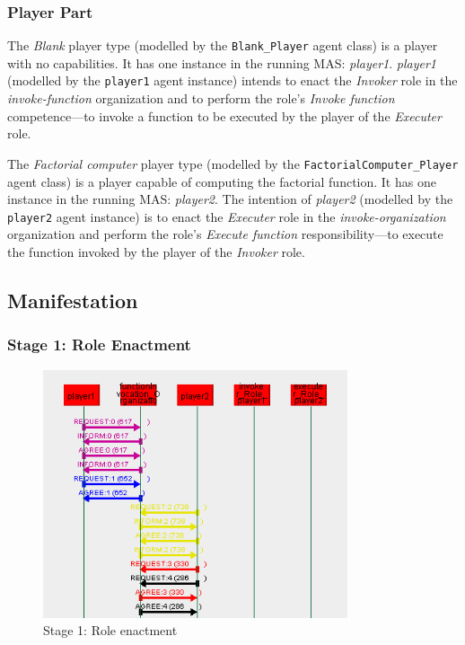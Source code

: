 \subsubsection*{Player Part}

The \textit{Blank} player type (modelled by the \texttt{Blank\_Player} agent class) is a player with no capabilities.
It has one instance in the running MAS: \textit{player1}.
\textit{player1} (modelled by the \texttt{player1} agent instance) intends to enact the \textit{Invoker} role in the \textit{invoke-function} organization and to perform the role's \textit{Invoke function} competence---to invoke a function to be executed by the player of the \textit{Executer} role.

The \textit{Factorial computer} player type (modelled by the \texttt{FactorialComputer\_Player} agent class) is a player capable of computing the factorial function.
It has one instance in the running MAS: \textit{player2}.
The intention of \textit{player2} (modelled by the \texttt{player2} agent instance) is to enact the \textit{Executer} role in the \textit{invoke-organization} organization and perform the role's \textit{Execute function} responsibility---to execute the function invoked by the player of the \textit{Invoker} role.

\subsection*{Manifestation}

\subsubsection*{Stage 1: Role Enactment}

\begin{figure}[H]
	\centering
	\includegraphics[width=0.8\textwidth]{images/examples/example1-stage1.png}
	\caption{Stage 1: Role enactment}
	\label{figure:example1-stage1}
\end{figure}

